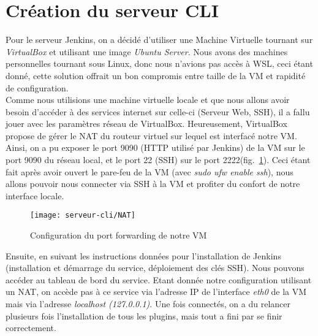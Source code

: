 
\section{Création du serveur CLI}
Pour le serveur Jenkins, on a décidé d'utiliser une Machine Virtuelle tournant sur \textit{VirtualBox} et utilisant une image \textit{Ubuntu Server}.
Nous avons des machines personnelles tournant sous Linux, donc nous n'avions pas accès à WSL, ceci étant donné, cette solution offrait un bon compromis entre taille de la VM et rapidité de configuration.\\

Comme nous utilisions une machine virtuelle locale et que nous allons avoir besoin d'accéder à des services internet sur celle-ci (Serveur Web, SSH), il a fallu jouer avec les paramètres réseau de VirtualBox.
Heureusement, VirtualBox propose de gérer le NAT du routeur virtuel sur lequel est interfacé notre VM\@.
Ainsi, on a pu exposer le port 9090 (HTTP utilisé par Jenkins) de la VM sur le port 9090 du réseau local, et le port 22 (SSH) sur le port 2222\@ (fig.~\ref{fig:NAT}).
Ceci étant fait après avoir ouvert le pare-feu de la VM (avec \textit{sudo ufw enable ssh}), nous allons pouvoir nous connecter via SSH à la VM et profiter du confort de notre interface locale.\\

\begin{figure}[h]
    \centering
    \texttt{[image: serveur-cli/NAT]}
    \caption{Configuration du port forwarding de notre VM}
    \label{fig:NAT}
\end{figure}


Ensuite, en suivant les instructions données pour l'installation de Jenkins (installation et démarrage du service, déploiement des clés SSH). Nous pouvons accéder au tableau de bord du service.
Etant donnée notre configuration utilisant un NAT, on accède pas à ce service via l'adresse IP de l'interface \textit{eth0} de la VM mais via l'adresse \textit{localhost (127.0.0.1)}.
Une fois connectés, on a du relancer plusieurs fois l'installation de tous les plugins, mais tout a fini par se finir correctement.
